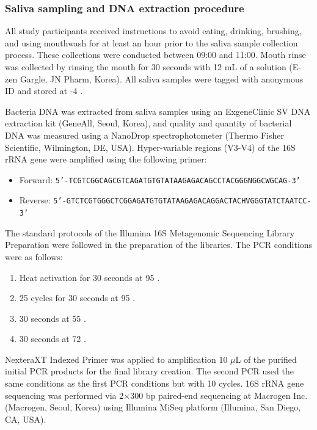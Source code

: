 \documentclass[11pt, a4paper, onecolumn, oneside]{report}
\begin{document}
            \subsubsection{Saliva sampling and DNA extraction procedure}
                All study participants received instructions to avoid eating, drinking, brushing, and using mouthwash for at least an hour prior to the saliva sample collection process. These collections were conducted between 09:00 and 11:00. Mouth rinse was collected by rinsing the mouth for 30 seconds with 12 mL of a solution (E-zen Gargle, JN Pharm, Korea). All saliva samples were tagged with anonymous ID and stored at -4 \textcelsius.

                Bacteria DNA was extracted from saliva samples using an Exgene\texttrademark Clinic SV DNA extraction kit (GeneAll, Seoul, Korea), and quality and quantity of bacterial DNA was measured using a NanoDrop spectrophotometer (Thermo Fisher Scientific, Wilmington, DE, USA). Hyper-variable regions (V3-V4) of the 16S rRNA gene were amplified using the following primer:
                \begin{itemize}
                    \item Forward: \texttt{5'-TCGTCGGCAGCGTCAGATGTGTATAAGAGACAGCCTACGGGNGGCWGCAG-3'}
                    \item Reverse: \texttt{5'-GTCTCGTGGGCTCGGAGATGTGTATAAGAGACAGGACTACHVGGGTATCTAATCC-3'}
                \end{itemize}

                The standard protocols of the Illumina 16S Metagenomic Sequencing Library Preparation were followed in the preparation of the libraries. The PCR conditions were as follows:
                \begin{enumerate}
                    \item Heat activation for 30 seconds at 95 \textcelsius.
                    \item 25 cycles for 30 seconds at 95 \textcelsius.
                    \item 30 seconds at 55 \textcelsius.
                    \item 30 seconds at 72 \textcelsius.
                \end{enumerate}

                NexteraXT Indexed Primer was applied to amplification 10 $\mu$L of the purified initial PCR products for the final library creation. The second PCR used the same conditions as the first PCR conditions but with 10 cycles. 16S rRNA gene sequencing was performed via 2$\times$300 bp paired-end sequencing at Macrogen Inc. (Macrogen, Seoul, Korea) using Illumina MiSeq platform (Illumina, San Diego, CA, USA).
\end{document}
